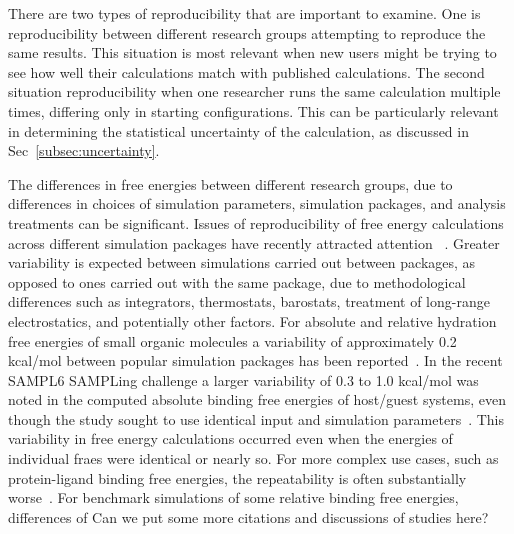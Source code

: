 \documentclass[9pt,bestpractices]{livecoms}
\begin{document}
There are two types of reproducibility that are important to examine.  One is reproducibility between different research groups attempting to reproduce the same results. This situation is most relevant when new users might be trying to see how well their calculations match with published calculations. The second situation reproducibility when one researcher runs the same calculation multiple times, differing only in starting configurations.  This can be particularly relevant in determining the statistical uncertainty of the calculation, as discussed in Sec~\ref{subsec:uncertainty}.


The differences in free energies between different research groups, due to differences in choices of simulation parameters, simulation packages, and analysis treatments can be significant. Issues of reproducibility of free energy calculations across different simulation packages have recently attracted attention ~\cite{loeffler2018reproducibility,rizzi2019sampl6, wade2022, herz2025modular}. Greater variability is expected between simulations carried out between packages, as opposed to ones carried out with the same package, due to methodological differences such as integrators, thermostats, barostats, treatment of long-range electrostatics, and potentially other factors. For absolute and relative hydration free energies of small organic molecules a variability of approximately 0.2 kcal/mol between popular simulation packages has been reported~\cite{loeffler2018reproducibility}. In the recent SAMPL6 SAMPLing challenge a larger variability of 0.3 to 1.0 kcal/mol was noted in the computed absolute binding free energies of host/guest systems, even though the study sought to use identical input and simulation parameters~\cite{rizzi2019sampl6}. This variability in free energy calculations occurred even when the energies of individual fraes were identical or nearly so.  For more complex use cases, such as protein-ligand binding free energies, the repeatability is often substantially worse~\cite{rizzi2019sampl6}.   For benchmark simulations of some relative binding free energies, differences of {\color{red}Can we put some more citations and discussions of studies here?} 
\end{document}
